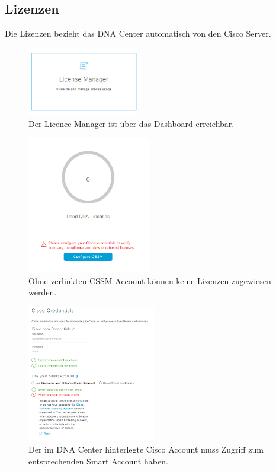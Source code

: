 \subsection{Lizenzen}
Die Lizenzen bezieht das DNA Center automatisch von den Cisco Server. 
\begin{figure}[H]
	\centering
	\includegraphics[height=3cm]{img/LicenceManager_001.png}
	\caption{Der Licence Manager ist über das Dashboard erreichbar.}
	\label{fig:dna-center-licence-1}
\end{figure}

\begin{figure}[H]
	\centering
	\includegraphics[height=6cm]{img/Selection_006.png}
	\caption{Ohne verlinkten CSSM Account können keine Lizenzen zugewiesen werden.}
	\label{fig:dna-center-licence-3}
\end{figure}

\begin{figure}[H]
	\centering
	\includegraphics[height=6cm]{img/Selection_008.png}
	\caption{Der im DNA Center hinterlegte Cisco Account muss Zugriff zum entsprechenden Smart Account haben.}
	\label{fig:dna-center-licence-4}
\end{figure}

